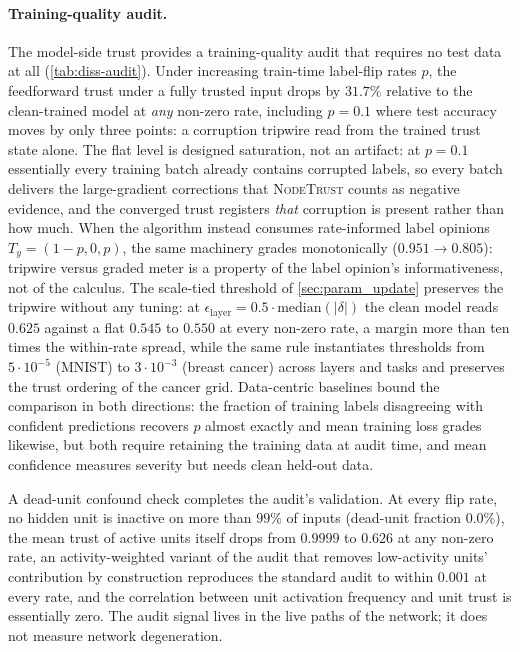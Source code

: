 \paragraph*{Training-quality audit.}
The model-side trust provides a training-quality audit that requires no test data at all (\cref{tab:diss-audit}). Under increasing train-time label-flip rates $p$, the feedforward trust under a fully trusted input drops by $31.7\%$ relative to the clean-trained model at \emph{any} non-zero rate, including $p = 0.1$ where test accuracy moves by only three points: a corruption tripwire read from the trained trust state alone. The flat level is designed saturation, not an artifact: at $p = 0.1$ essentially every training batch already contains corrupted labels, so every batch delivers the large-gradient corrections that \textsc{NodeTrust} counts as negative evidence, and the converged trust registers \emph{that} corruption is present rather than how much. When the algorithm instead consumes rate-informed label opinions $T_y = (1{-}p, 0, p)$, the same machinery grades monotonically ($0.951 \to 0.805$): tripwire versus graded meter is a property of the label opinion's informativeness, not of the calculus. The scale-tied threshold of \cref{sec:param_update} preserves the tripwire without any tuning: at $\epsilon_{\mathrm{layer}} = 0.5 \cdot \mathrm{median}(|\delta|)$ the clean model reads $0.625$ against a flat $0.545$ to $0.550$ at every non-zero rate, a margin more than ten times the within-rate spread, while the same rule instantiates thresholds from $5 \cdot 10^{-5}$ (MNIST) to $3 \cdot 10^{-3}$ (breast cancer) across layers and tasks and preserves the trust ordering of the cancer grid. Data-centric baselines bound the comparison in both directions: the fraction of training labels disagreeing with confident predictions recovers $p$ almost exactly and mean training loss grades likewise, but both require retaining the training data at audit time, and mean confidence measures severity but needs clean held-out data.

A dead-unit confound check completes the audit's validation. At every flip rate, no hidden unit is inactive on more than $99\%$ of inputs (dead-unit fraction $0.0\%$), the mean trust of active units itself drops from $0.9999$ to $0.626$ at any non-zero rate, an activity-weighted variant of the audit that removes low-activity units' contribution by construction reproduces the standard audit to within $0.001$ at every rate, and the correlation between unit activation frequency and unit trust is essentially zero. The audit signal lives in the live paths of the network; it does not measure network degeneration.

